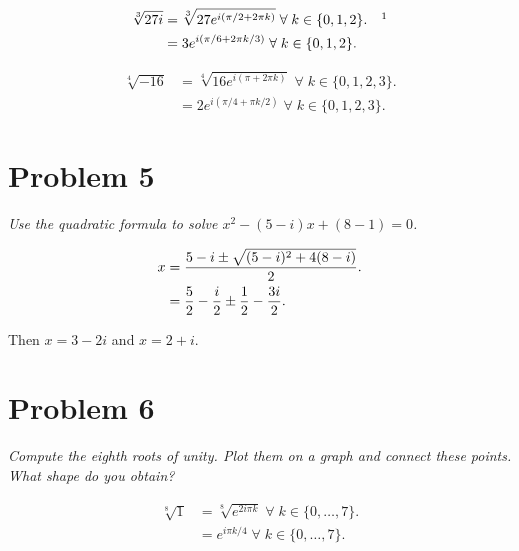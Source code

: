 \documentclass{tufte-handout}
\begin{document}
\begin{align*}
  \sqrt[3]{27 i} &= \sqrt[3]{27 e^{i (\pi / 2 + 2 \pi k)}} \; \forall
  \; k \in \{0,1,2\}. && \footnotemark\\
                 &= 3 e^{i (\pi / 6 + 2 \pi k / 3)} \; \forall \; k
                   \in \{0,1,2\}.
\end{align*}

\begin{align*}
  \sqrt[4]{-16} &= \sqrt[4]{16e^{i(\pi + 2\pi k)}} \; \forall \; k \in \{0,1,2,3\}.\\
                &= 2e^{i(\pi / 4 + \pi k / 2)} \; \forall \; k \in \{0,1,2,3\}.
\end{align*}

\section{Problem 5}

\begin{description}
\item \textit{Use the quadratic formula to solve
    $x^2 - (5 - i)x + (8 - 1) = 0$.}
\end{description}

\begin{align*}
  x &= {5 - i \pm \sqrt{(5 - i)^2 + 4(8 - i)} \over 2}.\\
    &= {5 \over 2} - {i \over 2} \pm {1 \over 2} - {3 i \over 2}.
\end{align*}

Then $x = 3 - 2 i$ and $x = 2 + i$.

\section{Problem 6}

\begin{description}
\item \textit{Compute the eighth roots of unity. Plot them on a graph and
  connect these points. What shape do you obtain?}
\end{description}

\begin{align*}
  \sqrt[8]{1} &= \sqrt[8]{e^{2 i \pi k}} \; \forall \; k \in
                \{0,\ldots,7\}.\\
              &= e^{i \pi k/ 4} \; \forall \; k \in \{0,\ldots,7\}.
\end{align*}
\end{document}
